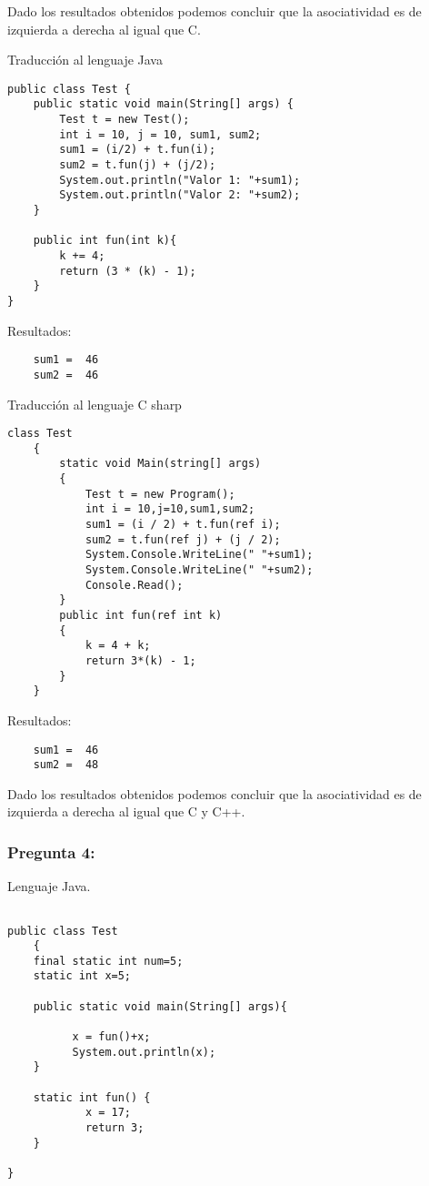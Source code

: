 \documentclass[11pt]{article}
\begin{document}
Dado los resultados obtenidos podemos concluir que la asociatividad es de izquierda a derecha al igual que C.

Traducción al lenguaje Java

\begin{lstlisting}[frame = single]
public class Test {
    public static void main(String[] args) {
        Test t = new Test();
        int i = 10, j = 10, sum1, sum2;
        sum1 = (i/2) + t.fun(i);
        sum2 = t.fun(j) + (j/2);
        System.out.println("Valor 1: "+sum1);
        System.out.println("Valor 2: "+sum2);
    }

    public int fun(int k){
        k += 4;
        return (3 * (k) - 1);
    }
}
\end{lstlisting}
\noindent Resultados:
\begin{verbatim}
	sum1 =  46
	sum2 =  46
\end{verbatim}

Traducción al lenguaje C sharp

\begin{lstlisting}[frame = single]
class Test
    {
        static void Main(string[] args)
        {
            Test t = new Program();
            int i = 10,j=10,sum1,sum2;
            sum1 = (i / 2) + t.fun(ref i);
            sum2 = t.fun(ref j) + (j / 2);
            System.Console.WriteLine(" "+sum1);
            System.Console.WriteLine(" "+sum2);
            Console.Read();
        }
        public int fun(ref int k)
        {
            k = 4 + k;
            return 3*(k) - 1;
        }
    }
\end{lstlisting}
\noindent Resultados:
\begin{verbatim}
	sum1 =  46
	sum2 =  48
\end{verbatim}
Dado los resultados obtenidos podemos concluir que la asociatividad es de izquierda a derecha al igual que C y C++.

\subsubsection{Pregunta 4:}

Lenguaje Java.

\begin{lstlisting}[frame=single] 

public class Test
    {
    final static int num=5;
    static int x=5;
   
    public static void main(String[] args){
        
          x = fun()+x; 
          System.out.println(x); 
    }

    static int fun() {
            x = 17;
            return 3;
    }

}
\end{lstlisting}
\end{document}
